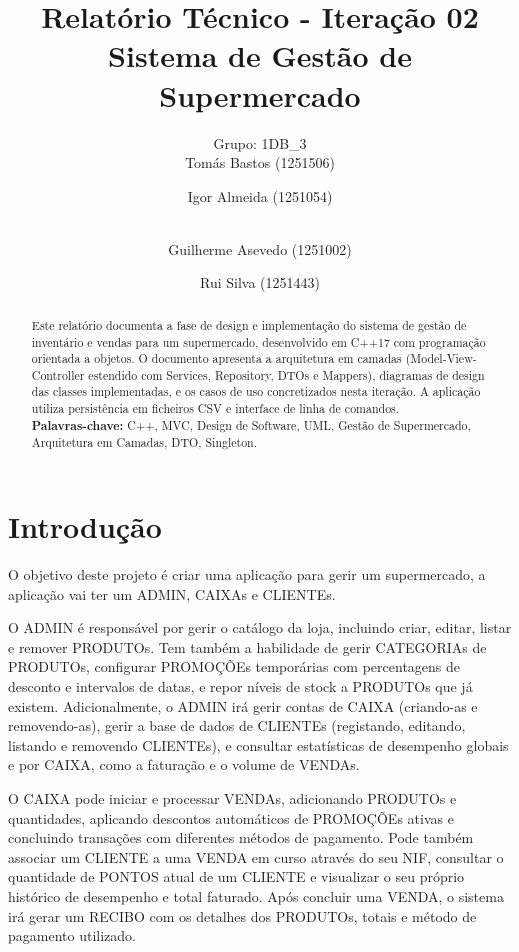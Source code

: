 \documentclass[a4paper]{llncs}
\begin{document}
\mainmatter

\title{Relatório Técnico - Iteração 02\\Sistema de Gestão de Supermercado}

\author{Grupo: 1DB\_3 \\
Tomás Bastos (1251506) \and Igor Almeida (1251054) \and \\
Guilherme Asevedo (1251002) \and Rui Silva (1251443)}

\maketitle

\begin{abstract}
Este relatório documenta a fase de design e implementação do sistema de gestão de inventário e vendas para um supermercado, desenvolvido em C++17 com programação orientada a objetos. O documento apresenta a arquitetura em camadas (Model-View-Controller estendido com Services, Repository, DTOs e Mappers), diagramas de design das classes implementadas, e os casos de uso concretizados nesta iteração. A aplicação utiliza persistência em ficheiros CSV e interface de linha de comandos.
\\
\textbf{Palavras-chave:} C++, MVC, Design de Software, UML, Gestão de Supermercado, Arquitetura em Camadas, DTO, Singleton.
\end{abstract}

\section{Introdução}
O objetivo deste projeto é criar uma aplicação para gerir um supermercado, a aplicação vai ter um ADMIN, CAIXAs e CLIENTEs.

O ADMIN é responsável por gerir o catálogo da loja, incluindo criar, editar, listar e remover PRODUTOs. Tem também a habilidade de gerir CATEGORIAs de PRODUTOs, configurar PROMOÇÕEs temporárias com percentagens de desconto e intervalos de datas, e repor níveis de stock a PRODUTOs que já existem. Adicionalmente, o ADMIN irá gerir contas de CAIXA (criando-as e removendo-as), gerir a base de dados de CLIENTEs (registando, editando, listando e removendo CLIENTEs), e consultar estatísticas de desempenho globais e por CAIXA, como a faturação e o volume de VENDAs.

O CAIXA pode iniciar e processar VENDAs, adicionando PRODUTOs e quantidades, aplicando descontos automáticos de PROMOÇÕEs ativas e concluindo transações com diferentes métodos de pagamento. Pode também associar um CLIENTE a uma VENDA em curso através do seu NIF, consultar o quantidade de PONTOS atual de um CLIENTE e visualizar o seu próprio histórico de desempenho e total faturado. Após concluir uma VENDA, o sistema irá gerar um RECIBO com os detalhes dos PRODUTOs, totais e método de pagamento utilizado.
\end{document}
